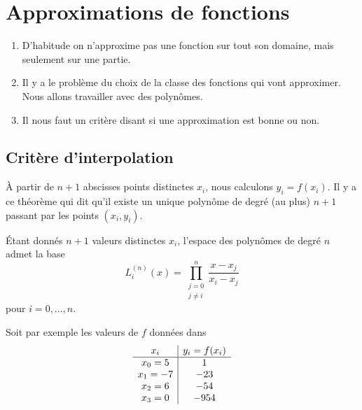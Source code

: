 \section{Approximations de fonctions}

\begin{enumerate}
	\item
	      D'habitude on n'approxime pas une fonction sur tout son domaine, mais seulement sur une partie.
	\item
	      Il y a le problème du choix de la classe des fonctions qui vont approximer. Nous allons travailler avec des polynômes.
	\item
	      Il nous faut un critère disant si une approximation est bonne ou non.
\end{enumerate}

\subsection{Critère d'interpolation}

À partir de \( n+1\) abscisses points distinctes \( x_i\), nous calculons \( y_i=f(x_i)\). Il y a ce théorème qui dit qu'il existe un unique polynôme de degré (au plus) \( n+1\) passant par les points \( (x_i,y_i)\).

\begin{propositionDef}
	Étant donnés \( n+1\) valeurs distinctes \( x_i\), l'espace des polynômes de degré \( n\) admet la base
	\begin{equation}
		L_i^{(n)}(x)=\prod_{\substack{j=0\\j\neq i}}^n\frac{ x-x_j }{ x_i-x_j }
	\end{equation}
	pour \( i=0,\ldots, n\).
\end{propositionDef}

Soit par exemple les valeurs de \( f\) données dans
\begin{equation*}
	\begin{array}[]{c|c}
		x_i    & y_i=f(x_i) \\
		\hline
		x_0=5  & 1          \\
		x_1=-7 & -23        \\
		x_2=6  & -54        \\
		x_3=0  & -954       \\
	\end{array}
\end{equation*}

